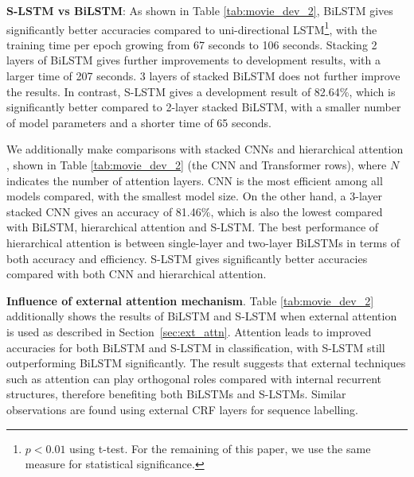 \documentclass[11pt,a4paper]{article}
\begin{document}
\textbf{S-LSTM vs BiLSTM}: As shown in Table \ref{tab:movie_dev_2}, BiLSTM gives significantly better accuracies compared to uni-directional LSTM\footnote{$p<0.01$ using t-test. For the remaining of this paper, we use the same measure for statistical significance.}, with the training time per epoch growing from 67 seconds to 106 seconds. 
Stacking 2 layers of BiLSTM gives further improvements to development results, with a larger time of 207 seconds. 
3 layers of stacked BiLSTM does not further improve the results.
In contrast, S-LSTM gives a development result of 82.64\%, which is significantly better compared to 2-layer stacked BiLSTM, with a smaller number of model parameters and a shorter time of 65 seconds.


We additionally make comparisons with stacked CNNs and hierarchical attention \cite{vaswani2017attention}, shown in Table \ref{tab:movie_dev_2} (the CNN and Transformer rows), where $N$ indicates the number of attention layers.
CNN is the most efficient among all models compared, with the smallest model size. 
On the other hand, a 3-layer stacked CNN gives an accuracy of 81.46\%, which is also the lowest compared with BiLSTM,  hierarchical attention and S-LSTM.
The best performance of hierarchical attention is between single-layer and two-layer BiLSTMs in terms of both accuracy and efficiency.
S-LSTM gives significantly better accuracies compared with both CNN and hierarchical attention.


{\bf Influence of external attention mechanism}. 
Table \ref{tab:movie_dev_2} additionally shows the results of BiLSTM and S-LSTM when external attention is used as described in Section~\ref{sec:ext_attn}. 
Attention leads to improved accuracies for both BiLSTM and S-LSTM in classification, with S-LSTM still outperforming BiLSTM significantly. 
The result suggests that external techniques such as attention can play orthogonal roles compared with internal recurrent structures, therefore benefiting both BiLSTMs and S-LSTMs. 
Similar observations are found using external CRF layers for sequence labelling.
\end{document}
